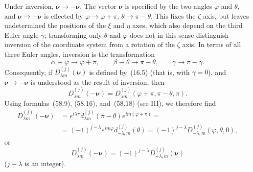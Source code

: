 Under inversion, $\boldsymbol\nu\to-\boldsymbol\nu$. The vector $\boldsymbol\nu$ is specified by the two angles $\varphi$ and $\theta$, and $\boldsymbol\nu\to-\boldsymbol\nu$ is effected by $\varphi\to\varphi+\pi$, $\theta\to\pi-\theta$. This fixes the $\zeta$ axis, but leaves undetermined the positions of the $\xi$ and $\eta$ axes, which also depend on the third Euler angle $\gamma$; transforming only $\theta$ and $\varphi$ does not in this sense distinguish inversion of the coordinate system from a rotation of the $\zeta$ axis. In terms of all three Euler angles, inversion is the transformation
\begin{equation}
\alpha\equiv\varphi\to\varphi+\pi,
\qquad
\beta\equiv\theta\to\pi-\theta,
\qquad
\gamma\to\pi-\gamma.
\tag{16.8}
\end{equation}
Consequently, if $D^{(j)}_{\lambda m}(\boldsymbol\nu)$ is defined by~(16.5) (that is, with $\gamma=0$), and $\boldsymbol\nu\to-\boldsymbol\nu$ is understood as the result of inversion, then
\begin{equation}
D^{(j)}_{\lambda m}(-\boldsymbol\nu)
=D^{(j)}_{\lambda m}(\varphi+\pi,\pi-\theta,\pi).
\tag{16.9}
\end{equation}
Using formulas~(58.9), (58.16), and~(58.18) (see III), we therefore find
\[
\begin{aligned}
D^{(j)}_{\lambda m}(-\boldsymbol\nu)
&=e^{i\lambda\pi}d^{(j)}_{\lambda m}(\pi-\theta)e^{im(\varphi+\pi)}={}\\
&=(-1)^{j-\lambda}e^{im\varphi}d^{(j)}_{-\lambda,m}(\theta)
=(-1)^{j-\lambda}D^{(j)}_{-\lambda,m}(\varphi,\theta,0),
\end{aligned}
\]
or
\begin{equation}
D^{(j)}_{\lambda m}(-\boldsymbol\nu)
=(-1)^{j-\lambda}D^{(j)}_{-\lambda,m}(\boldsymbol\nu)
\tag{16.10}
\end{equation}
($j-\lambda$ is an integer).

